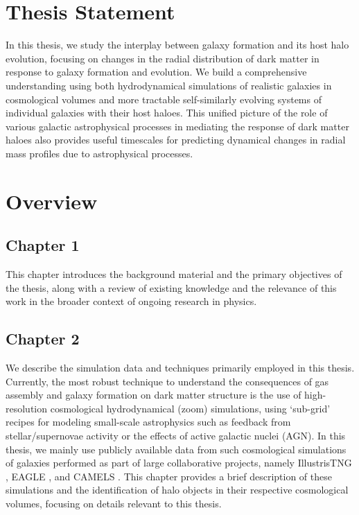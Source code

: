 \documentclass[a4paper, 12pt, oneside]{Thesis}  %
\begin{document}
\section*{Thesis Statement}

In this thesis, we study the interplay between galaxy formation and its host halo evolution, focusing on changes in the radial distribution of dark matter in response to galaxy formation and evolution. We build a comprehensive understanding using both hydrodynamical simulations of realistic galaxies in cosmological volumes and more tractable self-similarly evolving systems of individual galaxies with their host haloes. This unified picture of the role of various galactic astrophysical processes in mediating the response of dark matter haloes also provides useful timescales for predicting dynamical changes in radial mass profiles due to astrophysical processes.

\section*{Overview}

\subsection*{Chapter 1}
This chapter introduces the background material and the primary objectives of the thesis, along with a review of existing knowledge and the relevance of this work in the broader context of ongoing research in physics.

\subsection*{Chapter 2}
We describe the simulation data and techniques primarily employed in this thesis. Currently, the most robust technique to understand the consequences of gas assembly and galaxy formation on dark matter structure is the use of high-resolution cosmological hydrodynamical (zoom) simulations, using `sub-grid' recipes for modeling small-scale astrophysics such as feedback from stellar/supernovae activity or the effects of active galactic nuclei (AGN). In this thesis, we mainly use publicly available data from such cosmological simulations of galaxies performed as part of large collaborative projects, namely IllustrisTNG \cite{2019ComAC...6....2N}, EAGLE \cite{2015MNRAS.446..521S}, and CAMELS \cite{CAMELS_presentation,CAMELS_DR1}. This chapter provides a brief description of these simulations and the identification of halo objects in their respective cosmological volumes, focusing on details relevant to this thesis.
\end{document}
